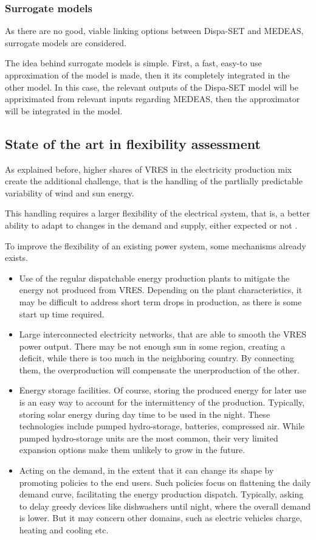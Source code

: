 \subsubsection{Surrogate models}

As there are no good, viable linking options between Dispa-SET and MEDEAS, surrogate models are considered.

The idea behind surrogate models is simple. First, a fast, easy-to use approximation of the model is made, then it its completely integrated in the other model. In this case, the relevant outputs of the Dispa-SET model will be appriximated from relevant inputs regarding MEDEAS, then the approximator will be integrated in the model.

\subsection{State of the art in flexibility assessment}

As explained before, higher shares of VRES in the electricity production mix create the additional challenge, that is the handling of the partlially predictable variability of wind and sun energy. 

This handling requires a larger flexibility of the electrical system, that is, a better ability to adapt to changes in the demand and supply, either expected or not \cite{irena}.

To improve the flexibility of an existing power system, some mechanisms already exists.
\begin{itemize}
    \item Use of the regular dispatchable energy production plants to mitigate the energy not produced from VRES. Depending on the plant characteristics, it may be difficult to address short term drops in production, as there is some start up time required.
    \item Large interconnected electricity networks, that are able to smooth the VRES power output. There may be not enough sun in some region, creating a deficit, while there is too much in the neighboring country. By connecting them, the overproduction will compensate the unerproduction of the other.
    \item Energy storage facilities. Of course, storing the produced energy for later use is an easy way to account for the intermittency of the production. Typically, storing solar energy during day time to be used in the night. These technologies include pumped hydro-storage, batteries, compressed air. While pumped hydro-storage units are the most common, their very limited expansion options make them unlikely to grow in the future.
    \item Acting on the demand, in the extent that it can change its shape by promoting policies to the end users. Such policies focus on flattening the daily demand curve, facilitating the energy production dispatch. Typically, asking to delay greedy devices like dishwashers until night, where the overall demand is lower. But it may concern other domains, such as electric vehicles charge, heating and cooling etc.
\end{itemize}

